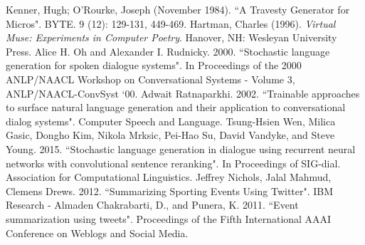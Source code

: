 \documentclass[12pt, journal]{IEEEtran}
\begin{document}
\begin{thebibliography}{9}
Kenner, Hugh; O'Rourke, Joseph (November 1984). ``A Travesty Generator for Micros". BYTE. 9 (12): 129-131, 449-469.
\newline
{}
 Hartman, Charles (1996). \textit{Virtual Muse: Experiments in Computer Poetry}. Hanover, NH: Wesleyan University Press.
\newline
{}
Alice  H. Oh and Alexander  I. Rudnicky. 2000. ``Stochastic language generation for spoken dialogue systems".  In Proceedings of the 2000 ANLP/NAACL Workshop  on Conversational  Systems  -  Volume  3, ANLP/NAACL-ConvSyst `00.
\newline
{}
Adwait Ratnaparkhi. 2002. ``Trainable approaches to surface natural language generation and their application to conversational dialog systems". Computer Speech and Language.
\newline
{}
Tsung-Hsien Wen, Milica Gasic, Dongho Kim, Nikola Mrksic,  Pei-Hao  Su,  David  Vandyke,  and  Steve Young.  2015.  ``Stochastic language generation in dialogue using recurrent neural networks with convolutional sentence reranking".  In Proceedings of SIG-dial. Association for Computational Linguistics.
\newline
{}
Jeffrey Nichols, Jalal Mahmud, Clemens Drews. 2012. ``Summarizing Sporting Events Using Twitter". IBM Research - Almaden
\newline
{}
Chakrabarti, D., and Punera, K. 2011. ``Event summarization using tweets". Proceedings of the Fifth International AAAI Conference on Weblogs and Social Media.

\end{thebibliography}

% 







\end{document}
